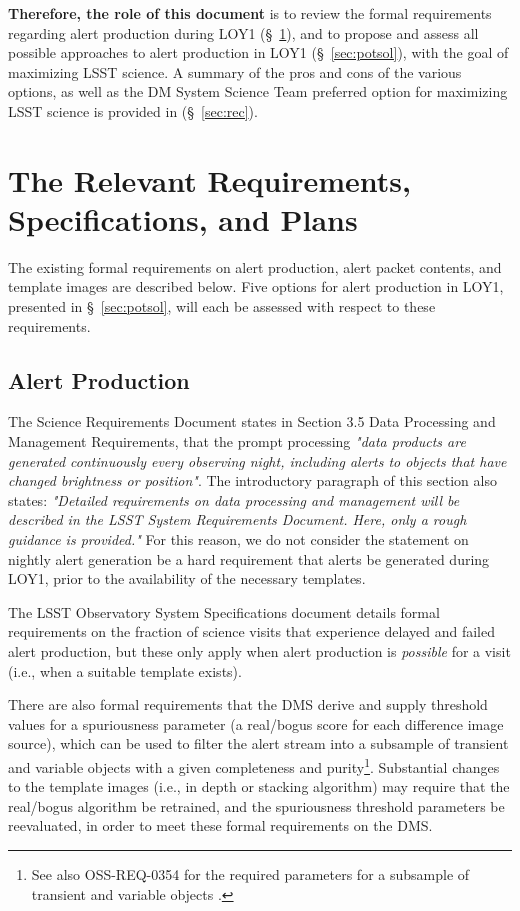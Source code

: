 \documentclass[DM,lsstdraft,toc]{lsstdoc}
\begin{document}
{\bf Therefore, the role of this document} is to review the formal requirements regarding alert production during LOY1 (\S~\ref{sec:req}), and to propose and assess all possible approaches to alert production in LOY1 (\S~\ref{sec:potsol}), with the goal of maximizing LSST science. A summary of the pros and cons of the various options, as well as the DM System Science Team preferred option for maximizing LSST science is provided in (\S~\ref{sec:rec}).

\clearpage
\section{The Relevant Requirements, Specifications, and Plans}\label{sec:req}

The existing formal requirements on alert production, alert packet contents, and template images are described below.
Five options for alert production in LOY1, presented in \S~\ref{sec:potsol}, will each be assessed with respect to these requirements.

\subsection{Alert Production}\label{ssec:req_ap}

The Science Requirements Document  states in Section 3.5 Data Processing and Management Requirements, that the prompt processing {\it "data products are generated continuously every observing night, including alerts to objects that have changed brightness or position"}. 
The introductory paragraph of this section also states: {\it "Detailed requirements on data processing and management will be described in the LSST System Requirements Document. Here, only a rough guidance is provided."} For this reason, we do not consider the  statement on nightly alert generation be a hard requirement that alerts be generated during LOY1, prior to the availability of the necessary templates. 

The LSST Observatory System Specifications document  details formal requirements on the fraction of science visits that experience delayed and failed alert production, but these only apply when alert production is {\em possible} for a visit (i.e., when a suitable template exists).

There are also formal requirements that the DMS derive and supply threshold values for a spuriousness parameter (a real/bogus score for each difference image source), which can be used to filter the alert stream into a subsample of transient and variable objects with a given completeness and purity\footnote{See also OSS-REQ-0354 for the required parameters for a subsample of transient and variable objects .}.
Substantial changes to the template images (i.e., in depth or stacking algorithm) may require that the real/bogus algorithm be retrained, and the spuriousness threshold parameters be reevaluated, in order to meet these formal requirements on the DMS. 
\end{document}
